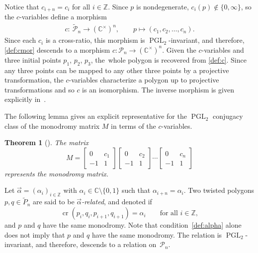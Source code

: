 \documentclass[pdftex]{sigma}
\numberwithin{equation}{section}
\newtheorem{Theorem}{Theorem}[section]
\newcommand{\Z}{{\mathbb Z}}
\newcommand{\C}{{\mathbb C}}
\newcommand{\PGL}{\operatorname{PGL}}
\newcommand{\arv}{\stackrel{\vec \alpha}{\sim}}
\newcommand{\ra}{\rightarrow}
\newcommand{\be}{\begin{equation}}
\newcommand{\ee}{\end{equation}}
\newcommand{\la}{\label}
\def\cro{\operatorname{cr}}
\begin{document}
	Notice that $c_{i+n}=c_i$ for all $i \in \Z$. Since $p$ is nondegenerate, $c_i(p) \notin \{0,\infty \}$, so the $c$-variables define a morphism
	\begin{align}\la{def:cmor}
		c\colon\ \widetilde{\mathcal P}_n \ra (\C^\times)^n, \qquad
		p \mapsto (c_1,c_2,\dots,c_n).
	\end{align}
	Since each $c_i$ is a cross-ratio, this morphism is $\PGL_2$-invariant, and therefore, \eqref{def:cmor} descends to a morphism $c\colon \mathcal P_n \ra (\C^\times)^n$. Given the $c$-variables and three initial points $p_1$, $p_2$, $p_3$, the~whole polygon is recovered from \eqref{def:c}. Since any three points can be mapped to any other three points by a projective transformation, the $c$-variables characterize a polygon up to projective transformations and so $c$ is an isomorphism. The inverse morphism is given explicitly in~\mbox{\cite[Section~3.2]{AFIT}}.
	
	The following lemma gives an explicit representative for the $\PGL_2$ conjugacy class of the monodromy matrix $M$ in terms of the $c$-variables.
	\begin{Theorem}[] %
		The matrix
		\[
		M=\begin{bmatrix}
			0 & c_1 \\
			-1 & 1
		\end{bmatrix} \begin{bmatrix}
			0 & c_2 \\
			-1 & 1
		\end{bmatrix} \cdots \begin{bmatrix}
			0 & c_n \\
			-1 & 1
		\end{bmatrix}
		\]
		represents the monodromy matrix.
	\end{Theorem}
	
Let $\vec \alpha = (\alpha_i)_{i \in \Z}$ with $\alpha_i \in \C \setminus \{0,1\}$ such that $\alpha_{i+n}=\alpha_i$.
	Two twisted polygons $p, q \in \widetilde P_n$ are said to be \emph{$\vec \alpha$-related}, and denoted \smash{$p \,\raisebox{-0.5pt}{$\arv$}\, q$} if
 \be \la{def:alpha}
	\cro(p_i,q_i,p_{i+1},q_{i+1}) = \alpha_i \qquad \text{for all $i \in \Z$},
	\ee
	and $p$ and $q$ have the same monodromy. Note that condition~\eqref{def:alpha} alone does not imply that $p$ and $q$ have the same monodromy. The relation \smash{\raisebox{-0.4pt}{$\arv$}} is $\PGL_2$-invariant, and therefore, descends to a relation on~$\mathcal P_n$.
	
\end{document}
